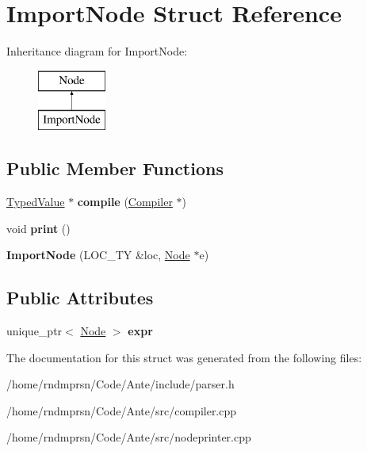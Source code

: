 \hypertarget{structImportNode}{}\section{Import\+Node Struct Reference}
\label{structImportNode}
Inheritance diagram for Import\+Node\+:\begin{figure}[H]
\begin{center}
\leavevmode
\includegraphics[height=2.000000cm]{structImportNode}
\end{center}
\end{figure}
\subsection*{Public Member Functions}
\begin{DoxyCompactItemize}
\item 
\mbox{\label{structImportNode_a091d487387b1a42356fa40b78397d437}} 
\hyperlink{structTypedValue}{Typed\+Value} $\ast$ {\bfseries compile} (\hyperlink{structante_1_1Compiler}{Compiler} $\ast$)
\item 
\mbox{\label{structImportNode_abd8c4aab407f8eee00841ae9518e8e53}} 
void {\bfseries print} ()
\item 
\mbox{\label{structImportNode_a1ea69f0ab1bff5b2081475a64393f2d2}} 
{\bfseries Import\+Node} (L\+O\+C\+\_\+\+TY \&loc, \hyperlink{structNode}{Node} $\ast$e)
\end{DoxyCompactItemize}
\subsection*{Public Attributes}
\begin{DoxyCompactItemize}
\item 
\mbox{\label{structImportNode_a7c01980c741cc642b528742d3849f36c}} 
unique\+\_\+ptr$<$ \hyperlink{structNode}{Node} $>$ {\bfseries expr}
\end{DoxyCompactItemize}


The documentation for this struct was generated from the following files\+:\begin{DoxyCompactItemize}
\item 
/home/rndmprsn/\+Code/\+Ante/include/parser.\+h\item 
/home/rndmprsn/\+Code/\+Ante/src/compiler.\+cpp\item 
/home/rndmprsn/\+Code/\+Ante/src/nodeprinter.\+cpp\end{DoxyCompactItemize}
